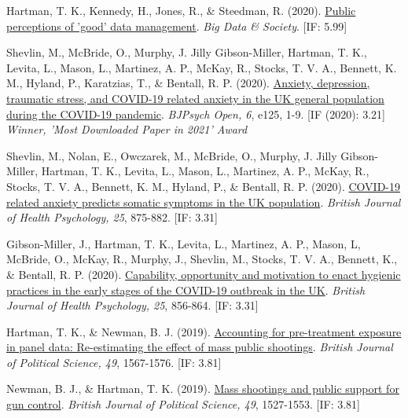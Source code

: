 \documentclass[12pt]{article}
\begin{document}
\begin{bibenum}
	\item Hartman, T. K., Kennedy, H., Jones, R., \& Steedman, R. (2020). 
		\href{https://10.1177/2053951720935616}{Public perceptions of 'good' data management}.
	 	\emph{Big Data \& Society}. [IF: 5.99]
		
	\item Shevlin, M.,  McBride, O., Murphy, J. Jilly Gibson-Miller, Hartman, T. K., 
	Levita, L., Mason, L., Martinez, A. P., McKay, R., Stocks, T. V. A., 
	Bennett, K. M., Hyland, P., Karatzias, T., \& Bentall, R. P. (2020). 
		\href{https://10.1192/bjo.2020.109}{Anxiety, depression, traumatic stress, 
		and COVID-19 related anxiety in the UK general population during the COVID-19 pandemic}.
		\emph{BJPsych Open, 6}, e125, 1-9. [IF (2020): 3.21]\\
		\textit{Winner, 'Most Downloaded Paper in 2021' Award}

	\item Shevlin, M., Nolan, E., Owczarek, M., McBride, O., Murphy, J. Jilly Gibson-Miller, 
	Hartman, T. K., Levita, L., Mason, L., Martinez, A. P., McKay, R., Stocks, T. V. A., 
	Bennett, K. M., Hyland, P., \& Bentall, R. P. (2020). 
		\href{https://10.1111/bjhp.12430}{COVID-19 related anxiety predicts somatic 
		symptoms in the UK population}.
	 	\emph{British Journal of Health Psychology, 25}, 875-882. [IF: 3.31]

	\item Gibson-Miller, J., Hartman, T. K., Levita, L., Martinez, A. P., Mason, L, 
	McBride, O., McKay, R., Murphy, J., Shevlin, M., Stocks, T. V. A., Bennett, K., 
	\& Bentall, R. P. (2020). 
		\href{https://10.1111/bjhp.12426}{Capability, opportunity and motivation 
		to enact hygienic practices in the early stages of the COVID-19 outbreak in the UK}.
		\emph{British Journal of Health Psychology, 25}, 856-864. [IF: 3.31]
		
    \item *{Hartman, T. K.}, \& Newman, B. J. (2019).
          \href{https://10.1017/S0007123418000467}
          {Accounting for pre-treatment exposure in panel data: 
          Re-estimating the effect of mass public shootings}.
          \emph{British Journal of Political Science, 49}, 1567-1576. [IF: 3.81]

    \item *Newman, B. J., \& {Hartman, T. K.} (2019).
          \href{https://10.1017/S0007123417000333}
          {Mass shootings and public support for gun control}.
          \emph{British Journal of Political Science, 49}, 1527-1553. [IF: 3.81]
      

\end{bibenum}
\end{document}
